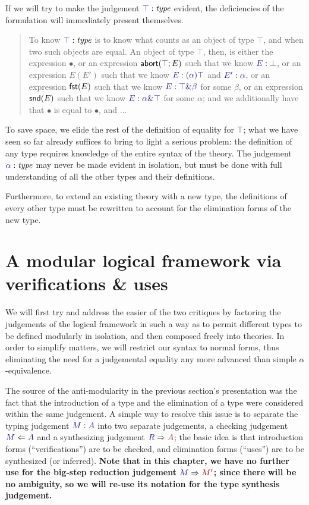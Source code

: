 \documentclass[main.tex]{subfiles}
\begin{document}
If we will try to make the judgement $\type\top$ evident, the deficiencies of
the formulation will immediately present themselves.

\begin{quote}
To know $\type\top$ is to know what counts as an object of type $\top$, and when
two such objects are equal. An object of type $\top$, then, is either the
expression $\bullet$, or an expression $\mathsf{abort}(\top;E)$ such that we know
$\ofty{E}{\bot}$, or an expression $E(E')$ such that we know $\ofty{E}{(\alpha)\top}$ and
$\ofty{E'}{\alpha}$, or an expression $\mathsf{fst}(E)$ such that we know $\ofty{E}{\product\top\beta}$
for some $\beta$, or an expression $\mathsf{snd}(E)$ such that we know
$\ofty{E}{\product\alpha\top}$ for some $\alpha$; and we additionally have that $\bullet$
is equal to $\bullet$, and ...
\end{quote}

To save space, we elide the rest of the definition of equality for $\top$; what
we have seen so far already suffices to bring to light a serious problem: the
definition of any type requires knowledge of the entire syntax of the theory.
The judgement $\type\alpha$ may never be made evident in isolation, but must be
done with full understanding of all the other types and their definitions.

Furthermore, to extend an existing theory with a new type, the definitions of
every other type must be rewritten to account for the elimination forms of the
new type.

\section{A modular logical framework via verifications \& uses}

We will first try and address the easier of the two critiques by
factoring the judgements of the logical framework in such a way as to
permit different types to be defined modularly in isolation, and then
composed freely into theories. In order to simplify matters, we will
restrict our syntax to normal forms, thus eliminating the need for a
judgemental equality any more advanced than simple
$\alpha$-equivalence.

The source of the anti-modularity in the previous section's
presentation was the fact that the introduction of a type and the
elimination of a type were considered within the same judgement. A
simple way to resolve this issue is to separate the typing judgement
$\ofty{M}{A}$ into two separate judgements, a checking judgement
$\checks{M}{A}$ and a synthesizing judgement
$\infers{R}{A}$; the basic idea is that introduction forms
(``verifications'') are to be checked, and elimination forms
(``uses'') are to be synthesized (or inferred). \textbf{Note that in this
chapter, we have no further use for the big-step reduction judgement
$\reduce{M}{M'}$; since there will be no ambiguity, so we will re-use
its notation for the type synthesis judgement.}
\end{document}
